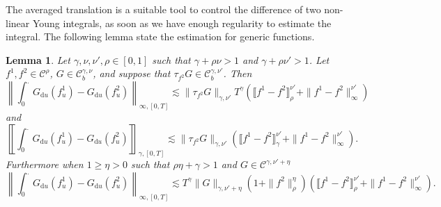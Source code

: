 \documentclass[a4paper,11pt]{article}
\newcommand{\mathd}{\mathrm{d}}
\newtheorem{lemma}[theorem]{Lemma}
\newcommand{\CC}{\mathscr C}
\begin{document}
The averaged translation is a suitable tool to control the difference of two
non-linear Young integrals, as soon as we have enough regularity to estimate
the integral. The following lemma state the estimation for generic functions.

\begin{lemma}
  Let $\gamma , \nu , \nu' , \rho \in [ 0,1 ]$ such that $\gamma + \rho \nu
  >1$ and $\gamma + \rho \nu' >1$. Let $f^{1} ,f^{2} \in \CC^{\rho}$, $G \in
  \CC_{b}^{\gamma , \nu}$, and suppose that $\tau_{f^{2}} G \in
  \CC_{b}^{\gamma , \nu'}$. Then
  \[ \left\| \int_{0}^{.} G_{\mathd u} ( f^{1}_{u} ) -G_{\mathd u} ( f^{2}_{u}
     ) \right\|_{\infty , [ 0,T ]} \lesssim \| \tau_{f^{2}} G \|_{\gamma ,
     \nu'} T^{\gamma} ( \llbracket f^{1} -f^{2} \rrbracket^{\nu'}_{\rho} + \|
     f^{1} -f^{2} \|^{\nu'}_{\infty} ) \]
  and
  \[ \left\llbracket \int_{0}^{.} G_{\mathd u} ( f^{1}_{u} ) -G_{\mathd u} (
     f^{2}_{u} ) \right\rrbracket_{\gamma , [ 0,T ]} \lesssim \| \tau_{f^{2}}
     G \|_{\gamma , \nu'} ( \llbracket f^{1} -f^{2} \rrbracket^{\nu'}_{\gamma}
     + \| f^{1} -f^{2} \|^{\nu'}_{\infty} ) . \]
  Furthermore when $1 \geqslant \eta >0$ such that $\rho \eta + \gamma >1$ and
  $G \in \CC^{\gamma , \nu' + \eta}$
  \[ \left\| \int_{0}^{.} G_{\mathd u} ( f^{1}_{u} ) -G_{\mathd u} ( f^{2}_{u}
     ) \right\|_{\infty , [ 0,T ]} \lesssim T^{\gamma} \| G \|_{\gamma , \nu'
     + \eta} ( 1+ \| f^{2} \|^{\eta}_{\rho} ) ( \llbracket f^{1} -f^{2}
     \rrbracket^{\nu'}_{\rho} + \| f^{1} -f^{2} \|^{\nu'}_{\infty} ) . \]
\end{lemma}
\end{document}
